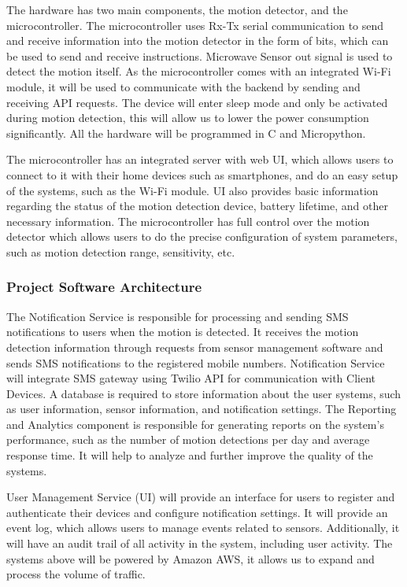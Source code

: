 \documentclass[conference]{IEEEtran}
\begin{document}
The hardware has two main components, the motion detector, and the microcontroller.
The microcontroller uses Rx-Tx serial communication to send and receive information
into the motion detector in the form of bits, which can be used to send and receive
instructions. Microwave Sensor out signal is used to detect the motion itself.
As the microcontroller comes with an integrated Wi-Fi module, it will be used to
communicate with the backend by sending and receiving API requests.
The device will enter sleep mode and only be activated during motion detection,
this will allow us to lower the power consumption significantly.
All the hardware will be programmed in C and Micropython.

The microcontroller has an integrated server with web UI, which allows users
to connect to it with their home devices such as smartphones, and do an easy setup
of the systems, such as the Wi-Fi module. UI also provides basic information regarding
the status of the motion detection device, battery lifetime, and other necessary
information. The microcontroller has full control over the motion detector which
allows users to do the precise configuration of system parameters, such as motion
detection range, sensitivity, etc.

\subsubsection{Project Software Architecture}

The Notification Service is responsible for processing and sending SMS notifications
to users when the motion is detected. It receives the motion detection information
through requests from sensor management software and sends SMS notifications to the
registered mobile numbers. Notification Service will integrate SMS gateway using
Twilio API for communication with Client Devices. A database is required to store
information about the user systems, such as user information, sensor information,
and notification settings. The Reporting and Analytics component is responsible
for generating reports on the system’s performance, such as the number of motion
detections per day and average response time. It will help to analyze and further
improve the quality of the systems.

User Management Service (UI) will provide an interface for users to register and
authenticate their devices and configure notification settings. It will provide an
event log, which allows users to manage events related to sensors. Additionally, it
will have an audit trail of all activity in the system, including user activity.
The systems above will be powered by Amazon AWS, it allows us to expand and process
the volume of traffic.
\end{document}
